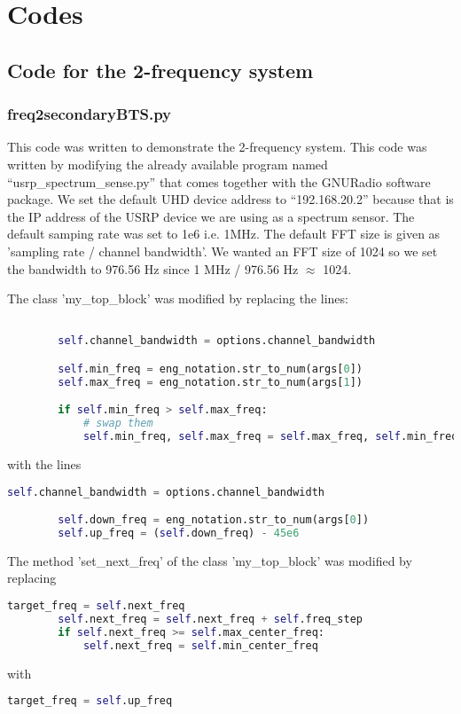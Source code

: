 \chapter{Codes}

\section{Code for the 2-frequency system}


\subsection{freq2secondaryBTS.py}

This code was written to demonstrate the 2-frequency system.
This code was written by modifying the already available program named 
``usrp\_spectrum\_sense.py'' that comes together with the GNURadio software
package. We set the 
default UHD device address to ``192.168.20.2'' because that is the IP address
of the USRP device we are using as a spectrum sensor. The default samping rate
was set to 1e6 i.e. 1MHz. The default FFT size is given as 'sampling rate /
channel bandwidth'. We wanted an FFT size of 1024 so we set the bandwidth to
976.56 Hz since 1 MHz / 976.56 Hz $\approx$ 1024.

The class 'my\_top\_block' was modified by replacing the lines:
\begin{lstlisting}[language=Python]

        self.channel_bandwidth = options.channel_bandwidth

        self.min_freq = eng_notation.str_to_num(args[0])
        self.max_freq = eng_notation.str_to_num(args[1])

        if self.min_freq > self.max_freq:
            # swap them
            self.min_freq, self.max_freq = self.max_freq, self.min_freq    
\end{lstlisting}
with the lines
\begin{lstlisting}[language=Python]
        self.channel_bandwidth = options.channel_bandwidth

        self.down_freq = eng_notation.str_to_num(args[0])
        self.up_freq = (self.down_freq) - 45e6    
\end{lstlisting}

The method 'set\_next\_freq' of the class 'my\_top\_block' was modified by
replacing
\begin{lstlisting}[language=Python]
        target_freq = self.next_freq
        self.next_freq = self.next_freq + self.freq_step
        if self.next_freq >= self.max_center_freq:
            self.next_freq = self.min_center_freq
\end{lstlisting}
with
\begin{lstlisting}[language=Python]
        target_freq = self.up_freq
\end{lstlisting}




